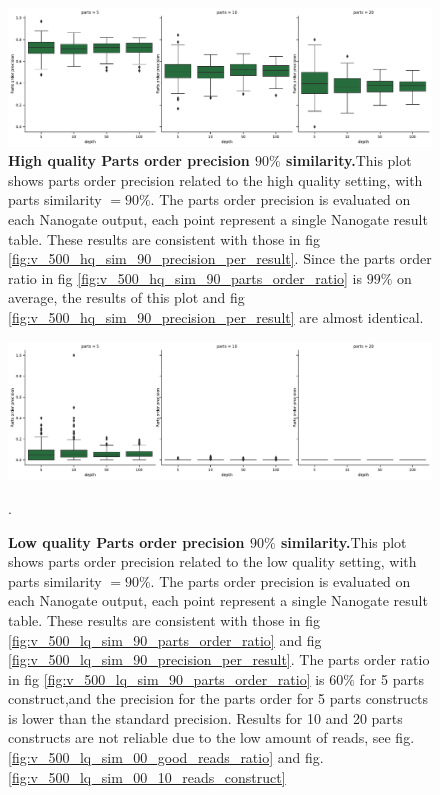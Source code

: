 \documentclass[11pt, a4paper]{article}
\begin{document}
\begin{figure}[ht]
    \begin{center}
    \includegraphics[width=1.35\textwidth]{../results/images_notebook/v_500/hq_sim_90_parts_order_precision.pdf}
    \end{center}
    \caption{{\bf High quality Parts order precision $90\%$ similarity.}This plot shows parts order precision related to the high quality setting, with parts similarity $=90\%$. The parts order precision is evaluated on each  Nanogate output, each point represent a single Nanogate result table. These results are consistent with those in fig \ref{fig:v_500_hq_sim_90_precision_per_result}. Since the parts order ratio in fig \ref{fig:v_500_hq_sim_90_parts_order_ratio} is $99\%$ on average, the results of this plot and  fig \ref{fig:v_500_hq_sim_90_precision_per_result} are almost identical.}
   \label{fig:v_500_hq_sim_90_parts_order_precision}
\end{figure}


\begin{figure}[ht]
    \begin{center}
    \includegraphics[width=1.35\textwidth]{../results/images_notebook/v_500/lq_sim_90_parts_order_precision.pdf}
    \end{center}
    \caption{{\bf Low quality Parts order precision $90\%$ similarity.}This plot shows parts order precision related to the low quality setting, with parts similarity $=90\%$. The parts order precision is evaluated on each  Nanogate output, each point represent a single Nanogate result table. These results are consistent with those in fig \ref{fig:v_500_lq_sim_90_parts_order_ratio} and  fig \ref{fig:v_500_lq_sim_90_precision_per_result}.
    The parts order ratio in fig \ref{fig:v_500_lq_sim_90_parts_order_ratio} is  $60\%$ for 5 parts construct,and the precision for the parts order for 5 parts constructs is lower than the standard precision. Results for 10 and 20 parts constructs are not reliable due to the low amount of reads, see fig. \ref{fig:v_500_lq_sim_00_good_reads_ratio} and fig. \ref{fig:v_500_lq_sim_00_10_reads_construct} }
   \label{fig:v_500_lq_sim_90_parts_order_precision}.  
\end{figure}
\end{document}

